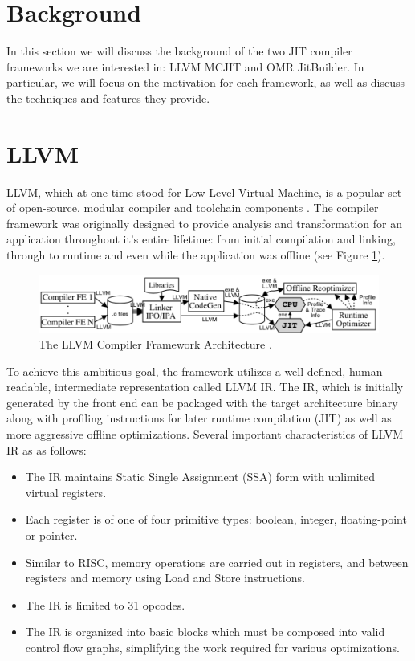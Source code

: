 \section{Background}
In this section we will discuss the background of the two JIT compiler frameworks we are interested in: LLVM MCJIT and OMR JitBuilder.
In particular, we will focus on the motivation for each framework, as well as discuss the techniques and features they provide.
\section{LLVM}
\label{sec:llvm}
LLVM, which at one time stood for Low Level Virtual Machine, is a popular set of open-source, modular compiler and toolchain components \cite{lattner2004llvm}.
The compiler framework was originally designed to provide analysis and transformation for an application throughout it's entire lifetime: from initial compilation and linking, through to runtime and even while the application was offline (see Figure \ref{fig:llvmarch}).
\begin{figure}
    \includegraphics[width=\textwidth]{images/llvm-architecture.png}
    \caption{ The LLVM Compiler Framework Architecture \cite{lattner2004llvm}.}
    \label{fig:llvmarch}
    \Description[]{}
\end{figure}
To achieve this ambitious goal, the framework utilizes a well defined, human-readable, intermediate representation called LLVM IR.
The IR, which is initially generated by the front end can be packaged with the target architecture binary along with profiling instructions for later runtime compilation (JIT) as well as more aggressive offline optimizations.
Several important characteristics of LLVM IR as as follows:
\begin{itemize}
    \item The IR maintains Static Single Assignment (SSA) form with unlimited virtual registers.
    \item Each register is of one of four primitive types: boolean, integer, floating-point or pointer.
    \item Similar to RISC, memory operations are carried out in registers, and between registers and memory using Load and Store instructions.
    \item The IR is limited to 31 opcodes.
    \item The IR is organized into basic blocks which must be composed into valid control flow graphs, simplifying the work required for various optimizations. 
\end{itemize}

